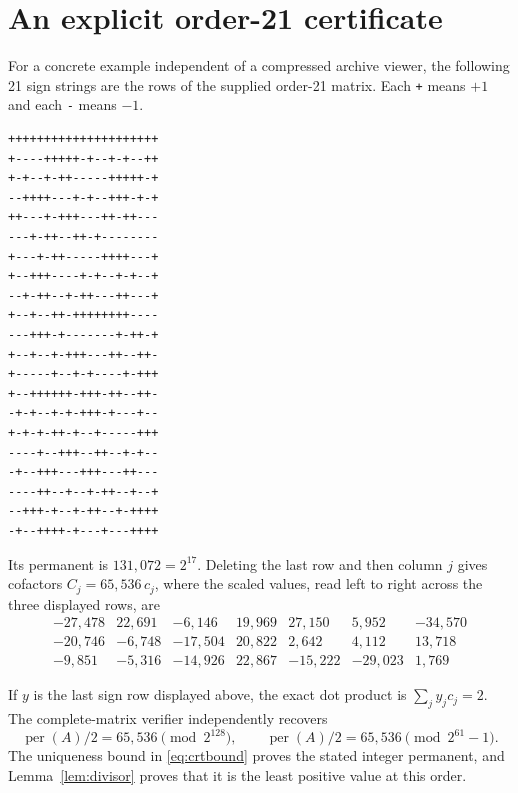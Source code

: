\documentclass[11pt,a4paper]{article}
\theoremstyle{remark}\newtheorem{remark}[theorem]{Remark}
\DeclareMathOperator{\per}{per}
\begin{document}
\section{An explicit order-21 certificate}
For a concrete example independent of a compressed archive viewer, the following 21 sign strings are the rows of the supplied order-21 matrix. Each \texttt{+} means $+1$ and each \texttt{-} means $-1$.
\begin{center}\small
\begin{BVerbatim}
+++++++++++++++++++++
+----+++++-+--+-+--++
+-+--+-++-----+++++-+
--++++---+-+--+++-+-+
++---+-+++---++-++---
---+-++--++-+--------
+---+-++-----++++---+
+--+++----+-+--+-+--+
--+-++--+-++---++---+
+--+--++-++++++++----
---+++-+-------+-++-+
+--+--+-+++---++--++-
+-----+--+-+----+-+++
+--++++++-+++-++--++-
-+-+--+-+-+++-+---+--
+-+-+-++-+--+-----+++
----+--+++--++--+-+--
-+--+++---+++---++---
----++--+--+-++--+--+
--+++-+--+-++--+-++++
-+--++++-+---+---++++
\end{BVerbatim}

\end{center}
Its permanent is $131,072=2^{17}$. Deleting the last row and then column $j$ gives cofactors $C_j=65,536\,c_j$, where the scaled values, read left to right across the three displayed rows, are
\[
\begin{array}{rrrrrrr}
-27,478 & 22,691 & -6,146 & 19,969 & 27,150 & 5,952 & -34,570 \\ 
-20,746 & -6,748 & -17,504 & 20,822 & 2,642 & 4,112 & 13,718 \\ 
-9,851 & -5,316 & -14,926 & 22,867 & -15,222 & -29,023 & 1,769
\end{array}
\]

If $y$ is the last sign row displayed above, the exact dot product is $\sum_jy_jc_j=2$. The complete-matrix verifier independently recovers
\[
 \per(A)/2=65,536\pmod{2^{128}},\qquad
 \per(A)/2=65,536\pmod{2^{61}-1}.
\]
The uniqueness bound in \eqref{eq:crtbound} proves the stated integer permanent, and Lemma~\ref{lem:divisor} proves that it is the least positive value at this order.
\end{document}
